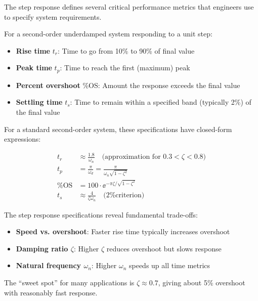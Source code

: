 The step response defines several critical performance metrics that engineers use to specify system requirements.

\begin{definitionbox}[title=Step Response Specifications]
For a second-order underdamped system responding to a unit step:
\begin{itemize}
    \item \textbf{Rise time} $t_r$: Time to go from 10\% to 90\% of final value
    \item \textbf{Peak time} $t_p$: Time to reach the first (maximum) peak
    \item \textbf{Percent overshoot} \%OS: Amount the response exceeds the final value
    \item \textbf{Settling time} $t_s$: Time to remain within a specified band (typically 2\%) of the final value
\end{itemize}
\end{definitionbox}

For a standard second-order system, these specifications have closed-form expressions:

\begin{align}
t_r &\approx \frac{1.8}{\omega_n} \quad \text{(approximation for } 0.3 < \zeta < 0.8\text{)} \\[6pt]
t_p &= \frac{\pi}{\omega_d} = \frac{\pi}{\omega_n\sqrt{1-\zeta^2}} \\[6pt]
\%\text{OS} &= 100 \cdot \ee^{-\pi\zeta/\sqrt{1-\zeta^2}} \\[6pt]
t_s &\approx \frac{4}{\zeta\omega_n} \quad \text{(2\% criterion)}
\end{align}

\begin{keyconceptbox}[title=Design Trade-offs]
The step response specifications reveal fundamental trade-offs:
\begin{itemize}
    \item \textbf{Speed vs. overshoot}: Faster rise time typically increases overshoot
    \item \textbf{Damping ratio $\zeta$}: Higher $\zeta$ reduces overshoot but slows response
    \item \textbf{Natural frequency $\omega_n$}: Higher $\omega_n$ speeds up all time metrics
\end{itemize}
The ``sweet spot'' for many applications is $\zeta \approx 0.7$, giving about 5\% overshoot with reasonably fast response.
\end{keyconceptbox}


